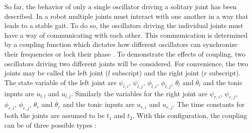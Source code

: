 \documentclass[12pt,twoside]{article}
\theoremstyle{plain}
\theoremstyle{definition}
\theoremstyle{remark}
\newcommand{\forceindent}{\leavevmode{\parindent=2em\indent}}
\begin{document}
\forceindent So far, the behavior of only a single oscillator driving a solitary joint has been described. In a robot multiple joints must interact with one another in a way that leads to a stable gait. To do so, the oscillators driving the individual joints must have a way of communicating with each other. This communication is determined by a coupling function which dictates how different oscillators can synchronize their frequencies or lock their phase \cite{Ronsse2009}. To demonstrate the effects of coupling, two oscillators driving two different joints will be considered. For convenience, the two joints may be called the left joint ($l$ subscript) and the right joint ($r$ subscript). The state variable of the left joint are $\psi_{l,i}$, $\psi_{l,j}$, $\phi_{l,i}$, $\phi_{l,j}$, $\theta_l$ and $\dot{\theta_l}$ and the tonic inputs are $u_{l,i}$ and $u_{l,j}$. Similarly the variables for the right joint are $\psi_{r,i}$, $\psi_{r,j}$, $\phi_{r,i}$, $\phi_{r,j}$, $\theta_r$ and $\dot{\theta_r}$ and the tonic inputs are $u_{r,i}$ and $u_{r,j}$. The time constants for both the joints are assumed to be $t_1$ and $t_2$. With this configuration, the coupling can be of three possible types \cite{Ronsse2009}:
\end{document}
